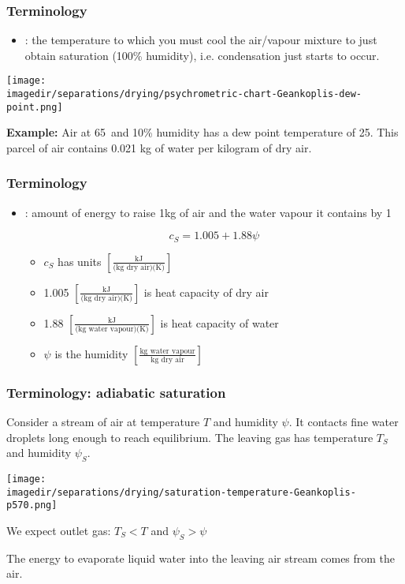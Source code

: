 \begin{frame}\frametitle{Terminology}
	\begin{itemize}
		\item	{\color{purple}{Dew point}}: the temperature to which you must cool the air/vapour mixture to just obtain saturation (100\% humidity), i.e. condensation just starts to occur.
	\end{itemize}
	
	\begin{center}
		\texttt{[image: \\imagedir/separations/drying/psychrometric-chart-Geankoplis-dew-point.png]}
	\end{center}
	
	\textbf{Example:} Air at 65\degC$\,$ and 10\% humidity has a dew point temperature of 25\degC. This parcel of air contains 0.021 kg of water per kilogram of dry air.
\end{frame}

\begin{frame}\frametitle{Terminology}
	\begin{itemize}
		\item	 {\color{purple}{Humid heat}}: amount of energy to raise 1kg of air and the water vapour it contains by 1\degC
		
		\begin{exampleblock}{}
			\[c_S = 1.005 + 1.88\psi\]
		\end{exampleblock}
		\begin{itemize}
			\item	$c_S$ has units $\left[\displaystyle \frac{\text{kJ}}{\text{(kg dry air)(K)}} \right]$
			\item	1.005 $\left[\displaystyle \frac{\text{kJ}}{\text{(kg dry air)(K)}} \right]$ is heat capacity of dry air
			\item	1.88 $\left[\displaystyle \frac{\text{kJ}}{\text{(kg water vapour)(K)}} \right]$ is heat capacity of water
			\item	$\psi$ is the humidity $ \left[ \displaystyle \frac{\text{kg water vapour}}{\text{kg dry air}}\right]$ 
		\end{itemize}
	\end{itemize}
\end{frame}

\begin{frame}\frametitle{Terminology: adiabatic saturation}
	Consider a stream of air at temperature $T$ and humidity $\psi$. It contacts fine water droplets long enough to reach equilibrium. The leaving gas has temperature $T_S$ and humidity $\psi_S$.
		
	\begin{center}
		\texttt{[image: \\imagedir/separations/drying/saturation-temperature-Geankoplis-p570.png]}
	\end{center}
	
	We expect outlet gas: $T_S < T$ and $\psi_S > \psi$
	
	\vspace{6pt}
	The energy to evaporate liquid water into the leaving air stream comes from the air.
\end{frame}

